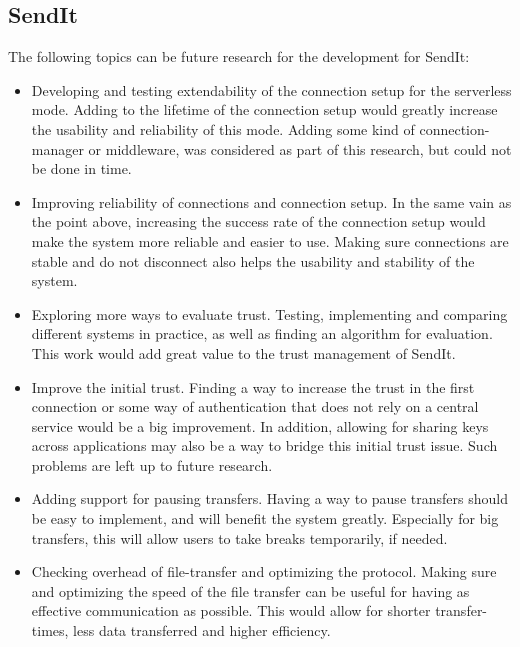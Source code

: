 \subsection{SendIt}
%
The following topics can be future research for the development for SendIt:
\begin{itemize}
	\item Developing and testing extendability of the connection setup for the serverless mode. Adding to the lifetime of the connection setup would greatly increase the usability and reliability of this mode. Adding some kind of connection-manager or middleware, was considered as part of this research, but could not be done in time.
	\item Improving reliability of connections and connection setup. In the same vain as the point above, increasing the success rate of the connection setup would make the system more reliable and easier to use. Making sure connections are stable and do not disconnect also helps the usability and stability of the system.
	\item Exploring more ways to evaluate trust. Testing, implementing and comparing different systems in practice, as well as finding an algorithm for evaluation. This work would add great value to the trust management of SendIt.
	\item Improve the initial trust. Finding a way to increase the trust in the first connection or some way of authentication that does not rely on a central service would be a big improvement. In addition, allowing for sharing keys across applications may also be a way to bridge this initial trust issue. Such problems are left up to future research.
	\item Adding support for pausing transfers. Having a way to pause transfers should be easy to implement, and will benefit the system greatly. Especially for big transfers, this will allow users to take breaks temporarily, if needed.
	\item Checking overhead of file-transfer and optimizing the protocol. Making sure and optimizing the speed of the file transfer can be useful for having as effective communication as possible. This would allow for shorter transfer-times, less data transferred and higher efficiency.
\end{itemize}
%
